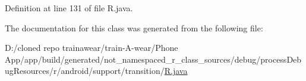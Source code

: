 Definition at line 131 of file R.\+java.



The documentation for this class was generated from the following file\+:\begin{DoxyCompactItemize}
\item 
D\+:/cloned repo trainawear/train-\/\+A-\/wear/\+Phone App/app/build/generated/not\+\_\+namespaced\+\_\+r\+\_\+class\+\_\+sources/debug/process\+Debug\+Resources/r/android/support/transition/\mbox{\hyperlink{process_debug_resources_2r_2android_2support_2transition_2_r_8java}{R.\+java}}\end{DoxyCompactItemize}
